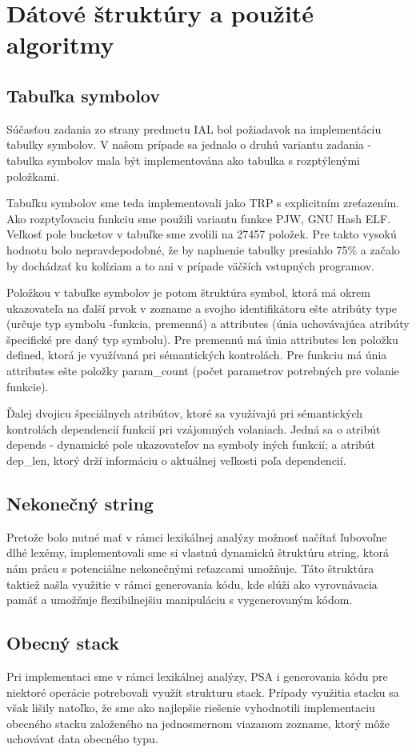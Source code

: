 \documentclass{article}
\begin{document}
	\section{Dátové štruktúry a použité algoritmy}
	\subsection{Tabuľka symbolov}
	Súčasťou zadania zo strany predmetu IAL bol požiadavok na implementáciu tabulky symbolov. V našom prípade sa jednalo o druhú variantu zadania - tabulka symbolov mala být implementována ako tabulka s rozptýlenými položkami.
	
	Tabuľku symbolov sme teda implementovali jako TRP s explicitním zreťazením. Ako rozptyľovaciu funkciu sme použili variantu funkce PJW, GNU Hash ELF. Veľkosť pole bucketov v tabuľke sme zvolili na 27457 položek. Pre takto vysokú hodnotu bolo nepravdepodobné, že by naplnenie tabulky presiahlo 75\% a začalo by dochádzať ku kolíziam a to ani v prípade väčších vstupných programov.
	
	Položkou v tabuľke symbolov je potom štruktúra symbol, ktorá má okrem ukazovateľa na ďalší prvok v zozname a svojho identifikátoru ešte atribúty type  (určuje typ symbolu -funkcia, premenná) a attributes (únia uchovávajúca atribúty špecifické pre daný typ symbolu). Pre premennú má únia attributes len položku defined, ktorá je využívaná pri sémantických kontrolách. Pre funkciu má únia attributes ešte položky param\_count (počet parametrov potrebných pre volanie funkcie).
	
	Ďalej dvojicu  špeciálnych atribútov, ktoré sa využívajú pri sémantických kontrolách dependencií funkcií pri vzájomných volaniach. Jedná sa o atribút depends - dynamické pole ukazovateľov na symboly iných funkcií; a atribút dep\_len, ktorý drží informáciu o aktuálnej veľkosti poľa dependencií.
	
	\subsection{Nekonečný string}
	Pretože bolo nutné mať v rámci lexikálnej analýzy možnosť načítať ľubovoľne dlhé lexémy, implementovali sme si vlastnú dynamickú štruktúru string, ktorá nám prácu s potenciálne nekonečnými reťazcami umožňuje. Táto štruktúra taktiež našla využitie v rámci generovania kódu, kde slúži ako vyrovnávacia pamäť a umožňuje flexibilnejšiu manipuláciu s vygenerovaným kódom.
	\subsection{Obecný stack}
	Pri implementaci sme v rámci lexikálnej analýzy, PSA i generovania kódu pre niektoré operácie potrebovali využít strukturu stack. Prípady využitia stacku sa však lišily natoľko, že sme ako najlepšie riešenie vyhodnotili implementaciu obecného stacku založeného na jednosmernom viazanom zozname, ktorý môže uchovávat data obecného typu.
	
\end{document}
